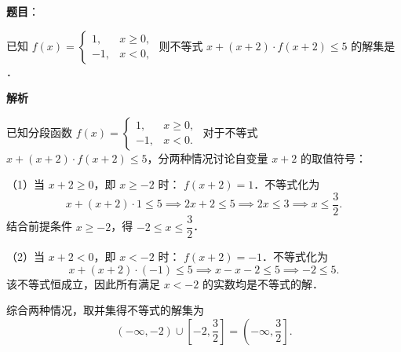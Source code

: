 \begin{answer}

\textbf{题目}：

已知 $f(x) = \begin{cases} 1, & x \geqslant 0, \\ -1, & x < 0, \end{cases}$ 则不等式 $x + (x + 2) \cdot f(x + 2) \leqslant 5$ 的解集是 \underline{\hspace{3cm}}．

\textbf{解析}

已知分段函数 $f(x) = \begin{cases} 1, & x \geqslant 0, \\ -1, & x < 0. \end{cases}$
对于不等式 $x + (x + 2) \cdot f(x + 2) \leqslant 5$，分两种情况讨论自变量 $x + 2$ 的取值符号：

（1）当 $x + 2 \geqslant 0$，即 $x \geqslant -2$ 时：
$f(x + 2) = 1$．不等式化为
\nopagebreak[4]
\[
x + (x + 2) \cdot 1 \leqslant 5 \implies 2x + 2 \leqslant 5 \implies 2x \leqslant 3 \implies x \leqslant \frac{3}{2}.
\]
结合前提条件 $x \geqslant -2$，得 $-2 \leqslant x \leqslant \dfrac{3}{2}$．

（2）当 $x + 2 < 0$，即 $x < -2$ 时：
$f(x + 2) = -1$．不等式化为
\nopagebreak[4]
\[
x + (x + 2) \cdot (-1) \leqslant 5 \implies x - x - 2 \leqslant 5 \implies -2 \leqslant 5.
\]
该不等式恒成立，因此所有满足 $x < -2$ 的实数均是不等式的解．

综合两种情况，取并集得不等式的解集为
\nopagebreak[4]
\[
(-\infty, -2) \cup \left[-2, \frac{3}{2}\right] = \left(-\infty, \frac{3}{2}\right].
\]

\gkanswer{答案：$\left(-\infty, \dfrac{3}{2}\right]$（或 $\{x \mid x \leqslant \dfrac{3}{2}\}$）}

\end{answer}
